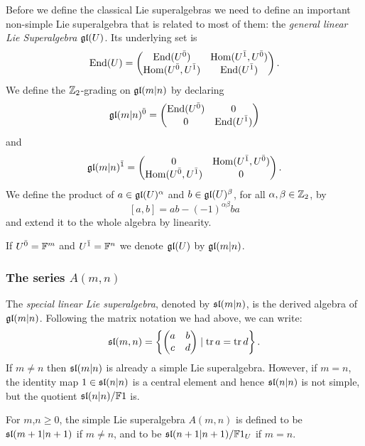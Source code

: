 Before we define the classical Lie superalgebras we need to define an important non-simple Lie superalgebra that is related to most of them: the \emph{general linear Lie Superalgebra} $\mathfrak{gl}(U)$. Its underlying set is 
%
\[\operatorname{End}(U)=\left(\begin{matrix}
            \operatorname{End}(U^{\bar0})       &  \operatorname{Hom}(U^{\bar1},U^{\bar0})\\
            \operatorname{Hom}(U^{\bar0},U^{\bar1}) &  \operatorname{End}(U^{\bar1})\\ 
 \end{matrix}
 \right).\]
 We define the $\mathbb{Z}_{2}$-grading on $\mathfrak{gl}(m|n)$ by declaring
\[\mathfrak{gl}(m|n)^{\bar0} = \left(\begin{matrix}
                    \operatorname{End}(U^{\bar0}) &  0\\
                     0           &  \operatorname{End}(U^{\bar1})\\ 
 \end{matrix}
 \right)\] and
 \[\mathfrak{gl}(m|n)^{\bar1} = \left(\begin{matrix}
                 0 &  \operatorname{Hom}(U^{\bar1},U^{\bar0})\\
                 \operatorname{Hom}(U^{\bar0},U^{\bar1}) & 0\\ 
 \end{matrix}
 \right).\]
%
We define the product of $a\in\mathfrak{gl}(U)^{\alpha}$ and $b\in\mathfrak{gl}(U)^{\beta}$, for all $\alpha,\beta\in\mathbb{Z}_{2}$, by
\[ [a,b] = ab - (-1)^{\alpha\beta}ba\]
and extend it to the whole algebra by linearity.

If $U^{\bar0} = \mathbb{F}^m$ and $U^{\bar1} = \mathbb{F}^n$ we denote $\mathfrak{gl}(U)$ by $\mathfrak{gl}(m|n)$. 

\subsubsection{The series $A(m,n)$} The \emph{special linear Lie superalgebra}, denoted by $\mathfrak{sl} (m|n)$, is the derived algebra of $\mathfrak{gl}(m|n)$. Following the matrix notation we had above, we can write:
%
\[ \mathfrak{sl}(m,n) =\left\{ 
\left(\begin{matrix}
                    a  &  b\\
                    c  &  d\\ 
 \end{matrix}\right) \mid \operatorname{tr} a = \operatorname{tr} d\right\}.
 \]
%
 If $m\neq n$ then $\mathfrak{sl}(m|n)$ is already a simple Lie superalgebra. However, if $m=n$, the identity map $1\in \mathfrak{sl}(n|n)$ is a central element and hence $\mathfrak{sl}(n|n)$ is not simple, but the quotient $\mathfrak{sl}(n|n)/ \mathbb{F} 1$ is.

For $m$,$n\geq 0$, the simple Lie superalgebra $A(m,n)$ is defined to be $\mathfrak{sl}(m+1|n+1)$ if $m\neq n$, and to be $\mathfrak{sl}(n+1|n+1)/ \mathbb{F} 1_U$ if $m=n$.

